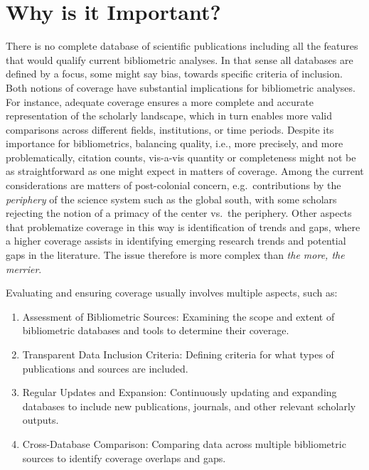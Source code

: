 \documentclass[
  letterpaper,
]{scrreprt}
\providecommand{\tightlist}{%
  \setlength{\itemsep}{0pt}\setlength{\parskip}{0pt}}
\begin{document}
\section{Why is it Important?}\label{why-is-it-important-1}

There is no complete database of scientific publications including all
the features that would qualify current bibliometric analyses. In that
sense all databases are defined by a focus, some might say bias, towards
specific criteria of inclusion. Both notions of coverage have
substantial implications for bibliometric analyses. For instance,
adequate coverage ensures a more complete and accurate representation of
the scholarly landscape, which in turn enables more valid comparisons
across different fields, institutions, or time periods. Despite its
importance for bibliometrics, balancing quality, i.e., more precisely,
and more problematically, citation counts, vis-a-vis quantity or
completeness might not be as straightforward as one might expect in
matters of coverage. Among the current considerations are matters of
post-colonial concern, e.g.~contributions by the \emph{periphery} of the
science system such as the global south, with some scholars rejecting
the notion of a primacy of the center vs.~the periphery. Other aspects
that problematize coverage in this way is identification of trends and
gaps, where a higher coverage assists in identifying emerging research
trends and potential gaps in the literature. The issue therefore is more
complex than \emph{the more, the merrier}.

Evaluating and ensuring coverage usually involves multiple aspects, such
as:

\begin{enumerate}
\def\labelenumi{\arabic{enumi}.}
\tightlist
\item
  Assessment of Bibliometric Sources: Examining the scope and extent of
  bibliometric databases and tools to determine their coverage.
\item
  Transparent Data Inclusion Criteria: Defining criteria for what types
  of publications and sources are included.
\item
  Regular Updates and Expansion: Continuously updating and expanding
  databases to include new publications, journals, and other relevant
  scholarly outputs.
\item
  Cross-Database Comparison: Comparing data across multiple bibliometric
  sources to identify coverage overlaps and gaps.
\end{enumerate}
\end{document}
